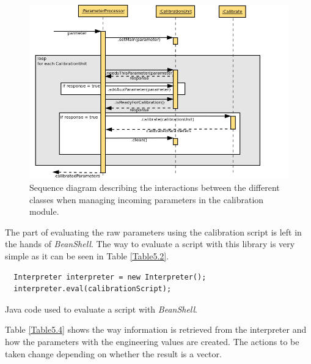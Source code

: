 \begin{figure}[H]
\centerline{\includegraphics[width=1.2\textwidth]{images/ReceiveParameterAndCalibrateSequence.png}}
\caption{Sequence diagram describing the interactions between the different classes when managing incoming parameters in the calibration module.}
\label{f5.6}
\end{figure}


The part of evaluating the raw parameters using the calibration script is left in the hands of \emph{BeanShell}. The way to evaluate a script with this library is very simple as it can be seen in Table \ref{Table5.2}. 


\begin{table}[h]
\lstset{language=Java}
\begin{lstlisting}
  Interpreter interpreter = new Interpreter();
  interpreter.eval(calibrationScript);
\end{lstlisting}
\caption{Java code used to evaluate a script with \emph{BeanShell}.}
\label{Table5.2}
\end{table}


Table \ref{Table5.4} shows the way information is retrieved from the interpreter and how the parameters with the engineering values are created. The actions to be taken change depending on whether the result is a vector.

